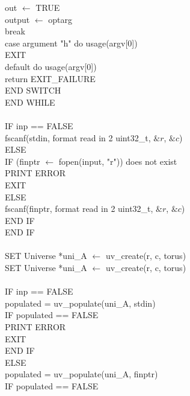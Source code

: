 \documentclass[12pt]{article}
\begin{document}
\indent \indent \indent \indent out $\leftarrow$ TRUE \\
\indent \indent \indent \indent output $\leftarrow$ optarg \\
\indent \indent \indent \indent break \\
\indent \indent \indent case argument "h" do usage(argv[0]) \\
\indent \indent \indent \indent EXIT \\
\indent \indent \indent default do usage(argv[0]) \\
\indent \indent \indent \indent return EXIT\_FAILURE \\
\indent \indent END SWITCH \\
\indent END WHILE \\
\\
\indent IF inp == FALSE \\
\indent \indent fscanf(stdin, format read in 2 uint32\_t, $\&r$, $\&c$) \\
\indent ELSE \\
\indent \indent IF (finptr $\leftarrow$ fopen(input, "r")) does not exist \\
\indent \indent \indent PRINT ERROR \\
\indent \indent \indent EXIT \\
\indent \indent ELSE \\
\indent \indent \indent fscanf(finptr, format read in 2 uint32\_t, $\&r$, $\&c$) \\
\indent \indent END IF \\
\indent END IF \\
\\
\indent SET Universe *uni\_A $\leftarrow$ uv\_create(r, c, torus) \\
\indent SET Universe *uni\_A $\leftarrow$ uv\_create(r, c, torus) \\
\\
\indent IF inp == FALSE \\
\indent \indent populated = uv\_populate(uni\_A, stdin) \\
\indent \indent IF populated == FALSE \\
\indent \indent \indent PRINT ERROR \\
\indent \indent \indent EXIT \\
\indent \indent END IF \\
\indent ELSE \\
\indent \indent populated = uv\_populate(uni\_A, finptr) \\
\indent \indent IF populated == FALSE \\
\end{document}

